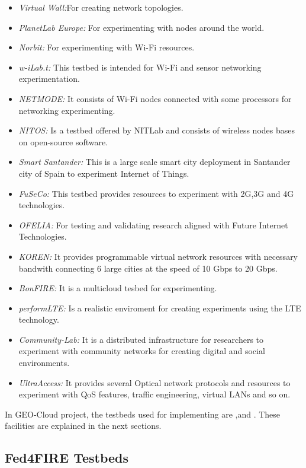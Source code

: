 \begin{itemize}
\item \emph{Virtual Wall:}For creating network topologies. 
\item \emph{PlanetLab Europe:} For experimenting with nodes around the world.
\item \emph{Norbit:} For experimenting with Wi-Fi resources.
\item \emph{w-iLab.t:} This testbed is intended for Wi-Fi and sensor networking experimentation.
\item \emph{NETMODE:} It consists of Wi-Fi nodes connected with some processors
  for networking experimenting.
\item \emph{NITOS:} Is a testbed offered by NITLab and consists of wireless
  nodes bases on open-source software. 
\item \emph{Smart Santander:} This is a large scale smart city deployment in
  Santander city of Spain to experiment Internet of Things. 
\item \emph{FuSeCo:} This testbed provides resources to experiment with 2G,3G
  and 4G technologies.
\item \emph{OFELIA:} For testing and validating research aligned
  with Future Internet Technologies.
\item \emph{KOREN:} It provides programmable virtual network resources with
  necessary bandwith connecting 6 large cities at the speed of 10 Gbps to 20 Gbps. 
\item \emph{BonFIRE:} It is a multicloud tesbed for experimenting.
\item \emph{performLTE:} Is a realistic enviroment for creating experiments
  using the LTE technology.
\item \emph{Community-Lab:} It is a distributed infrastructure for researchers
  to experiment with community networks for creating digital and social environments.
\item \emph{UltraAccess:} It provides several Optical network protocols and
  resources to experiment with QoS features, traffic engineering, virtual LANs
  and so on.
\end{itemize}

In GEO-Cloud project, the testbeds used for implementing are \vw,\pl and
\bonfire. These facilities are explained in the next sections.

\subsection{Fed4FIRE Testbeds}

